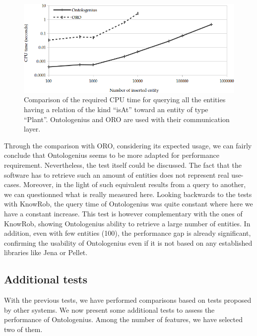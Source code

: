 \begin{figure}[ht!]
\centering
\includegraphics[width=\textwidth]{figures/chapter2/oro/R2.png}
\caption{\label{fig:chap2_oro_r2} Comparison of the required CPU time for querying all the entities having a relation of the kind ``isAt'' toward an entity of type ``Plant''. Ontologenius and ORO are used with their communication layer.}
\end{figure}

Through the comparison with ORO, considering its expected usage, we can fairly conclude that Ontologenius seems to be more adapted for performance requirement. Nevertheless, the test itself could be discussed. The fact that the software has to retrieve such an amount of entities does not represent real use-cases. Moreover, in the light of such equivalent results from a query to another, we can questionned what is really measured here. Looking backwards to the tests with KnowRob, the query time of Ontologenius was quite constant where here we have a constant increase. This test is however complementary with the ones of KnowRob, showing Ontologenius ability to retrieve a large number of entities. In addition, even with few entities (100), the performance gap is already significant, confirming the usability of Ontologenius even if it is not based on any established libraries like Jena or Pellet. 

\subsection{Additional tests}

With the previous tests, we have performed comparisons based on tests proposed by other systems. We now present some additional tests to assess the performance of Ontologenius. Among the number of features, we have selected two of them.

